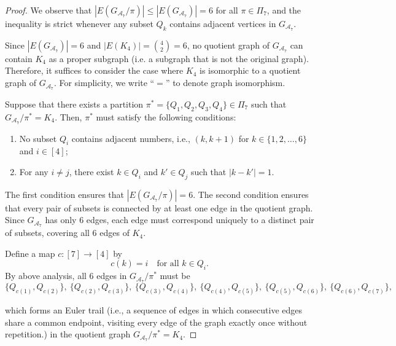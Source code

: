 \documentclass[sn-mathphys, natbib=false]{sn-jnl}
\theoremstyle{plain}
\theoremstyle{definition}
\newcommand{\partition}{\Pi}
\newcommand{\partitionp}[1]{\partition_{#1}}
\newcommand{\edges}[0]{E}
\newcommand{\edgesp}[1]{E(#1)}
\newcommand{\completegraphp}[1]{K_{#1}}
\newcommand{\graphform}[1]{G_{#1}}
\def\calA{\mathcal{A}}
\begin{document}
\begin{bibunit}[agsm]
\begin{proof}
We observe that $|\edgesp{\graphform{\calA_7} / \pi}| \le |\edgesp{\graphform{\calA_7}}| = 6$ for all $\pi \in \partitionp{7}$, and the inequality is strict whenever any subset $Q_k$ contains adjacent vertices in $\graphform{\calA_7}$.

Since $|\edges(\graphform{\calA_7})| = 6$ and $|\edges(\completegraphp{4})| = \binom{4}{2} = 6$, no quotient graph of $\graphform{\calA_7}$ can contain $\completegraphp{4}$ as a proper subgraph (i.e. a subgraph that is not the original graph). 
Therefore, it suffices to consider the case where $\completegraphp{4}$ is isomorphic to a quotient graph of $\graphform{\calA_7}$. 
For simplicity, we write ``$=$'' to denote graph isomorphism.

Suppose that there exists a partition $\pi^{*} = \{ Q_1, Q_2, Q_3, Q_4 \} \in \Pi_7$ such that $\graphform{\calA_7} / \pi^{*} = \completegraphp{4}$. 
Then, $\pi^{*}$ must satisfy the following conditions:

\begin{enumerate}
    \item No subset $Q_i$ contains adjacent numbers, i.e., $(k, k+1)$ for $k \in \{1,2,\dots,6\}$ and $i \in [4]$;
    \item For any $i \neq j$, there exist $k \in Q_i$ and $k' \in Q_j$ such that $|k - k'| = 1$.
\end{enumerate}

The first condition ensures that $|\edgesp{\graphform{\calA_7} / \pi}| = 6$. 
The second condition ensures that every pair of subsets is connected by at least one edge in the quotient graph. 
Since $\graphform{\calA_7}$ has only $6$ edges, each edge must correspond uniquely to a distinct pair of subsets, covering all $6$ edges of $\completegraphp{4}$.

Define a map $c: [7] \to [4]$ by
\begin{equation*}
    c(k) = i \quad \text{for all } k \in Q_i.
\end{equation*}
By above analysis, all 6 edges in $\graphform{\calA_7} / \pi^*$ must be 
\begin{equation*}
\{ Q_{c(1)}, Q_{c(2)} \}, \ 
\{ Q_{c(2)}, Q_{c(3)} \}, \ 
\{ Q_{c(3)}, Q_{c(4)} \}, \ 
\{ Q_{c(4)}, Q_{c(5)} \}, \ 
\{ Q_{c(5)}, Q_{c(6)} \}, \ 
\{ Q_{c(6)}, Q_{c(7)} \},
\end{equation*}

which forms an Euler trail (i.e., a sequence of edges in which consecutive edges share a common endpoint, visiting every edge of the graph exactly once without repetition.) in the quotient graph $\graphform{\calA_7} / \pi^* = \completegraphp{4}$.


\end{proof}
\end{bibunit}
\end{document}
